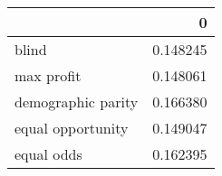 \begin{tabular}{lr}
\toprule
{} &         0 \\
\midrule
blind              &  0.148245 \\
max profit         &  0.148061 \\
demographic parity &  0.166380 \\
equal opportunity  &  0.149047 \\
equal odds         &  0.162395 \\
\bottomrule
\end{tabular}
